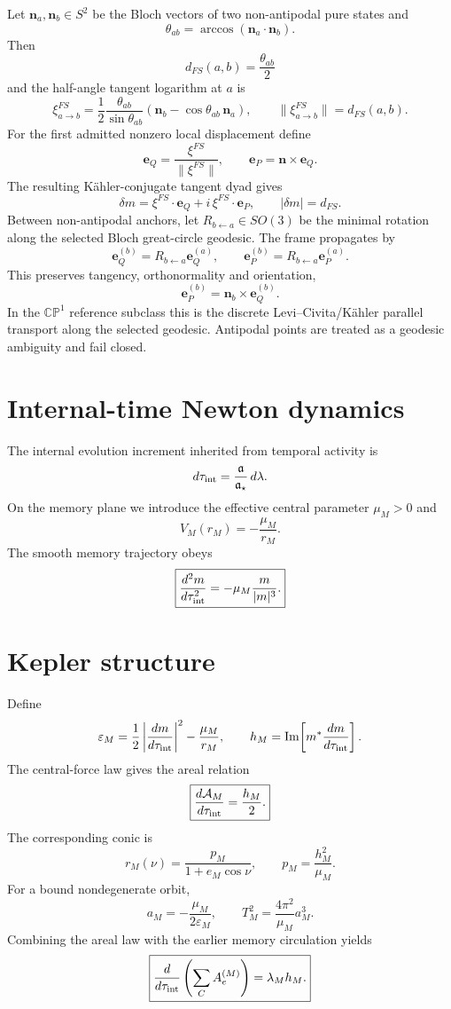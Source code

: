 Let \(\mathbf n_a,\mathbf n_b\in S^2\) be the Bloch vectors of two non-antipodal pure states and
\[
\theta_{ab}=\arccos(\mathbf n_a\cdot\mathbf n_b).
\]
Then
\[
d_{FS}(a,b)=\frac{\theta_{ab}}{2}
\]
and the half-angle tangent logarithm at \(a\) is
\[
\boxed{
\xi^{FS}_{a\to b}
=\frac12\frac{\theta_{ab}}{\sin\theta_{ab}}
\left(\mathbf n_b-\cos\theta_{ab}\,\mathbf n_a\right),
\qquad
\|\xi^{FS}_{a\to b}\|=d_{FS}(a,b).
}
\]
For the first admitted nonzero local displacement define
\[
\mathbf e_Q=\frac{\xi^{FS}}{\|\xi^{FS}\|},
\qquad
\boxed{\mathbf e_P=\mathbf n\times\mathbf e_Q}.
\]
The resulting K\"ahler-conjugate tangent dyad gives
\[
\boxed{
\delta m
=\xi^{FS}\cdot\mathbf e_Q
+i\,\xi^{FS}\cdot\mathbf e_P,
\qquad
|\delta m|=d_{FS}.
}
\]
Between non-antipodal anchors, let \(R_{b\leftarrow a}\in SO(3)\) be the minimal rotation along the selected Bloch great-circle geodesic. The frame propagates by
\[
\boxed{
\mathbf e_Q^{(b)}=R_{b\leftarrow a}\mathbf e_Q^{(a)},
\qquad
\mathbf e_P^{(b)}=R_{b\leftarrow a}\mathbf e_P^{(a)}.
}
\]
This preserves tangency, orthonormality and orientation,
\[
\mathbf e_P^{(b)}=\mathbf n_b\times\mathbf e_Q^{(b)}.
\]
In the \(\mathbb{CP}^1\) reference subclass this is the discrete Levi--Civita/K\"ahler parallel transport along the selected geodesic. Antipodal points are treated as a geodesic ambiguity and fail closed.

\section{Internal-time Newton dynamics}

The internal evolution increment inherited from temporal activity is
\[
d\tau_{\rm int}=\frac{\mathfrak a}{\mathfrak a_\star}\,d\lambda.
\]
On the memory plane we introduce the effective central parameter \(\mu_M>0\) and
\[
V_M(r_M)=-\frac{\mu_M}{r_M}.
\]
The smooth memory trajectory obeys
\[
\boxed{
\frac{d^2m}{d\tau_{\rm int}^2}
=-\mu_M\frac{m}{|m|^3}.
}
\]

\section{Kepler structure}

Define
\[
\varepsilon_M
=\frac12\left|\frac{dm}{d\tau_{\rm int}}\right|^2
-\frac{\mu_M}{r_M},
\qquad
h_M
=\operatorname{Im}\!\left[m^*\frac{dm}{d\tau_{\rm int}}\right].
\]
The central-force law gives the areal relation
\[
\boxed{
\frac{d\mathcal A_M}{d\tau_{\rm int}}
=\frac{h_M}{2}.
}
\]
The corresponding conic is
\[
r_M(\nu)
=\frac{p_M}{1+e_M\cos\nu},
\qquad
p_M=\frac{h_M^2}{\mu_M}.
\]
For a bound nondegenerate orbit,
\[
a_M=-\frac{\mu_M}{2\varepsilon_M},
\qquad
T_M^2=\frac{4\pi^2}{\mu_M}a_M^3.
\]
Combining the areal law with the earlier memory circulation yields
\[
\boxed{
\frac{d}{d\tau_{\rm int}}
\left(\sum_C A_e^{(M)}\right)
=\lambda_M h_M.
}
\]

